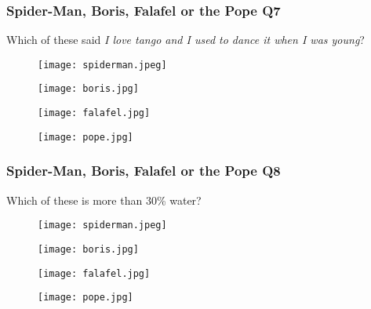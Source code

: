 \documentclass{beamer}
\begin{document}
\begin{frame}
\frametitle{Spider-Man, Boris, Falafel or the Pope Q7}
Which of these said \textit{I love tango and I used to dance it when I was young}?
\begin{figure}[!htb]
    \centering
    \begin{minipage}{.5\textwidth}
        \centering
        \texttt{[image: spiderman.jpeg]}
        
    \end{minipage}%
    \begin{minipage}{0.5\textwidth}
        \centering
        \texttt{[image: boris.jpg]}
        
    \end{minipage}
\end{figure}
\begin{figure}[!htb]
    \centering
    \begin{minipage}{.5\textwidth}
        \centering
        \texttt{[image: falafel.jpg]}
        
    \end{minipage}%
    \begin{minipage}{0.5\textwidth}
        \centering
        \texttt{[image: pope.jpg]}
        
    \end{minipage}
\end{figure}
\end{frame}



\begin{frame}
\frametitle{Spider-Man, Boris, Falafel or the Pope Q8}
Which of these is more than 30\% water?
\begin{figure}[!htb]
    \centering
    \begin{minipage}{.5\textwidth}
        \centering
        \texttt{[image: spiderman.jpeg]}
        
    \end{minipage}%
    \begin{minipage}{0.5\textwidth}
        \centering
        \texttt{[image: boris.jpg]}
        
    \end{minipage}
\end{figure}
\begin{figure}[!htb]
    \centering
    \begin{minipage}{.5\textwidth}
        \centering
        \texttt{[image: falafel.jpg]}
        
    \end{minipage}%
    \begin{minipage}{0.5\textwidth}
        \centering
        \texttt{[image: pope.jpg]}
        
    \end{minipage}
\end{figure}
\end{frame}
\end{document}
